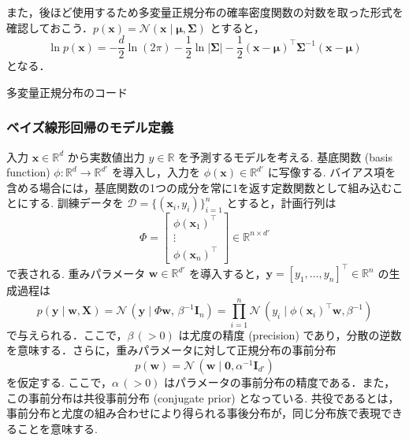 \documentclass[titlepage]{ltjsbook}
\begin{document}
また，後ほど使用するため多変量正規分布の確率密度関数の対数を取った形式を確認しておこう．$p(\mathbf{x})=\mathcal{N}(\mathbf{x} \mid \boldsymbol{\mu}, \boldsymbol{\Sigma}) $ とすると，
\begin{equation}
\ln p(\mathbf{x}) = -\frac{d}{2} \ln (2\pi) - \frac{1}{2} \ln \lvert\boldsymbol{\Sigma}\rvert - \frac{1}{2}(\mathbf{x} - \boldsymbol{\mu})^\top \boldsymbol{\Sigma}^{-1} (\mathbf{x} - \boldsymbol{\mu})
\end{equation}
となる．

\begin{tcolorbox}
多変量正規分布のコード
\end{tcolorbox}

\subsubsection{ベイズ線形回帰のモデル定義}
入力 $\mathbf{x} \in \mathbb{R}^d$ から実数値出力 $y \in \mathbb{R}$ を予測するモデルを考える. 基底関数 (basis function) $\phi:\mathbb{R}^d \to \mathbb{R}^{d'}$ を導入し，入力を $\phi(\mathbf{x}) \in \mathbb{R}^{d'}$ に写像する. バイアス項を含める場合には，基底関数の1つの成分を常に1を返す定数関数として組み込むことにする. 訓練データを $\mathcal{D}=\{(\mathbf{x}_i, y_i)\}_{i=1}^n$ とすると，計画行列は
\begin{equation}
\Phi = 
\begin{bmatrix}
\phi(\mathbf{x}_1)^\top \\
\vdots \\
\phi(\mathbf{x}_n)^\top
\end{bmatrix}
\in \mathbb{R}^{n\times d'}
\end{equation}
で表される. 重みパラメータ $\mathbf{w}\in\mathbb{R}^{d'}$ を導入すると，$\mathbf{y}=[y_1,\dots,y_n]^\top \in \mathbb{R}^n$ の生成過程は
\begin{equation}
p(\mathbf{y}\mid \mathbf{w},\mathbf{X})
=\mathcal{N}\,\left(\mathbf{y}\mid \Phi \mathbf{w},\,\beta^{-1}\mathbf{I}_n\right)
= \prod_{i=1}^n \mathcal{N}\,\left(y_i\mid \phi(\mathbf{x}_i)^\top\mathbf{w} , \beta^{-1}\right)
\end{equation}
で与えられる．ここで，$\beta\,(>0)$ は尤度の精度 (precision) であり，分散の逆数を意味する．さらに，重みパラメータに対して正規分布の事前分布
\begin{equation}
p(\mathbf{w})=\mathcal{N}\,\left(\mathbf{w}\mid \mathbf{0},\alpha^{-1} \mathbf{I}_{d'}\right)
\end{equation}
を仮定する. ここで，$\alpha\,(>0)$ はパラメータの事前分布の精度である．また，この事前分布は共役事前分布 (conjugate prior) となっている. 共役であるとは，事前分布と尤度の組み合わせにより得られる事後分布が，同じ分布族で表現できることを意味する. 
\end{document}
